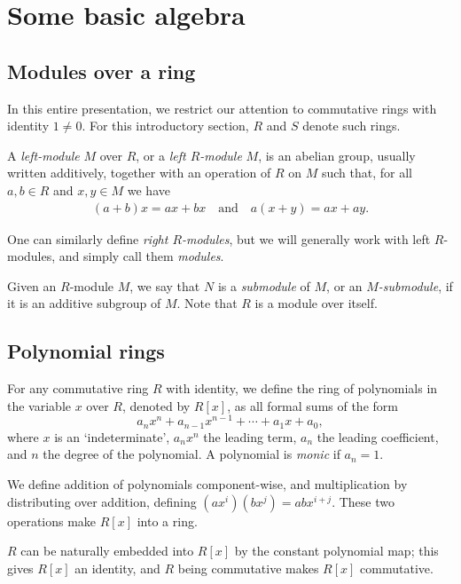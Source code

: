 \section{Some basic algebra}


\subsection{Modules over a ring}

In this entire presentation, we restrict our attention to commutative rings with identity $1\neq 0$. For this introductory section, $R$ and $S$ denote such rings.

\begin{defn}
	A \emph{left-module} $M$ over $R$, or a \emph{left $R$-module} $M$, is an abelian group, usually written additively, together with an operation of $R$ on $M$ such that, for all $a,b\in R$ and $x,y\in M$ we have
	\begin{align*}
		(a+b)x = ax+bx \quad \text{and} \quad a(x+y)=ax+ay.
	\end{align*}
\end{defn}

One can similarly define \emph{right $R$-modules}, but we will generally work with left $R$-modules, and simply call them \emph{modules}.

Given an $R$-module $M$, we say that $N$ is a \emph{submodule} of $M$, or an \emph{$M$-submodule}, if it is an additive subgroup of $M$. Note that $R$ is a module over itself.


\subsection{Polynomial rings}

For any commutative ring $R$ with identity, we define the ring of polynomials in the variable $x$ over $R$, denoted by $R[x]$, as all formal sums of the form
\[
	a_nx^n+a_{n-1}x^{n-1}+\cdots + a_1x + a_0,
\]
where $x$ is an `indeterminate', $a_nx^n$ the leading term, $a_n$ the leading coefficient, and $n$ the degree of the polynomial. A polynomial is \emph{monic} if $a_n=1$.

We define addition of polynomials component-wise, and multiplication by distributing over addition, defining $(ax^i)(bx^j)=abx^{i+j}$. These two operations make $R[x]$ into a ring.

$R$ can be naturally embedded into $R[x]$ by the constant polynomial map; this gives $R[x]$ an identity, and $R$ being commutative makes $R[x]$ commutative.



